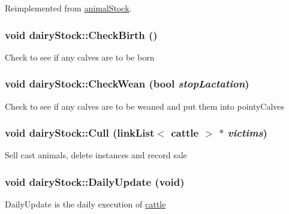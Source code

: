 Reimplemented from \hyperlink{classanimal_stock_aa52ee60094491bbcf82325fd5479f109}{animalStock}.\hypertarget{classdairy_stock_ab6fa75b8d046e8de37589b02829fb50e}{
\subsubsection[{CheckBirth}]{\setlength{\rightskip}{0pt plus 5cm}void dairyStock::CheckBirth ()}}
\label{classdairy_stock_ab6fa75b8d046e8de37589b02829fb50e}
Check to see if any calves are to be born \hypertarget{classdairy_stock_a19f2b3a2ee8d65b4b7419e327baa2eb0}{
\subsubsection[{CheckWean}]{\setlength{\rightskip}{0pt plus 5cm}void dairyStock::CheckWean (bool {\em stopLactation})}}
\label{classdairy_stock_a19f2b3a2ee8d65b4b7419e327baa2eb0}
Check to see if any calves are to be weaned and put them into pointyCalves \hypertarget{classdairy_stock_aa404f38c38a68b7cecd44b8fd96229ee}{
\subsubsection[{Cull}]{\setlength{\rightskip}{0pt plus 5cm}void dairyStock::Cull ({\bf linkList}$<$ {\bf cattle} $>$ $\ast$ {\em victims})}}
\label{classdairy_stock_aa404f38c38a68b7cecd44b8fd96229ee}
Sell cast animals, delete instances and record sale \hypertarget{classdairy_stock_a6650864514247ac49a701d3e40cdad9a}{
\subsubsection[{DailyUpdate}]{\setlength{\rightskip}{0pt plus 5cm}void dairyStock::DailyUpdate (void)}}
\label{classdairy_stock_a6650864514247ac49a701d3e40cdad9a}
DailyUpdate is the daily execution of \hyperlink{classcattle}{cattle} 

